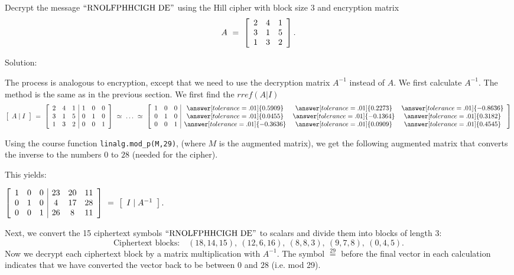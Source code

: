\documentclass{ximera}
\begin{document}
\begin{example}\label{ex:hill-cipher-decryption}

  Decrypt the message $\q{RNOLFPHHCIGH DE}$ using the Hill cipher with
  block size $3$ and encryption matrix
  \begin{equation*}
    A ~=~ \startmat{ccc}
      2 & 4 & 1 \\
      3 & 1 & 5 \\
      1 & 3 & 2 \\
    \stopmat.
  \end{equation*}

  Solution:

  The process is analogous to encryption, except that we need to use
  the decryption matrix $A^{-1}$ instead of $A$. We first calculate
  $A^{-1}$.
  The method is the same as in the previous section. We first find the $rref(A|I)$
  \begin{equation*}
    \startmat{c}A\mid I\stopmat
    ~=~
    \startmat{ccc|ccc}
      2 & 4 & 1  &  1 & 0 & 0 \\
      3 & 1 & 5  &  0 & 1 & 0 \\
      1 & 3 & 2  &  0 & 0 & 1 \\
    \stopmat
    ~\simeq~\ldots~\simeq~
    \startmat{ccc|ccc}
    1 & 0 & 0  & \answer[tolerance=.01]{0.5909} & \answer[tolerance=.01]{0.2273} & \answer[tolerance=.01]{-0.8636} \\
    0 & 1 & 0  &   \answer[tolerance=.01]{0.0455} & \answer[tolerance=.01]{-0.1364} & \answer[tolerance=.01]{0.3182} \\
    0 & 0 & 1 & \answer[tolerance=.01]{-0.3636} & \answer[tolerance=.01]{0.0909} & \answer[tolerance=.01]{0.4545}
    \stopmat
  \end{equation*}

  Using the course function \texttt{linalg.mod\_p(M,29)}, (where $M$ is the augmented matrix), we get the following augmented matrix that converts the inverse to the numbers $0$ to $28$ (needed for the cipher).

  This yields:

  $\startmat{ccc|ccc}
      1 & 0 & 0  &  23 & 20 & 11 \\
      0 & 1 & 0  &   4 & 17 & 28 \\
      0 & 0 & 1  &  26 &  8 & 11 \\
    \stopmat
    ~=~
    \startmat{c}I\mid A^{-1}\stopmat.$

  Next, we convert the 15 ciphertext symbols $\q{RNOLFPHHCIGH DE}$ to
  scalars and divide them into blocks of length 3:
  \begin{equation*}
    \mbox{Ciphertext blocks:}\quad
    (18,14,15),\
    (12,6,16),\
    (8,8,3),\
    (9,7,8),\
    (0,4,5).
  \end{equation*}
  Now we decrypt each ciphertext block by a matrix multiplication
  with $A^{-1}$. The symbol $\stackrel{29}{=}$ before the final vector in each calculation indicates that we have converted the vector back to be between $0$ and $28$ (i.e. mod 29).


\end{example}
\end{document}

